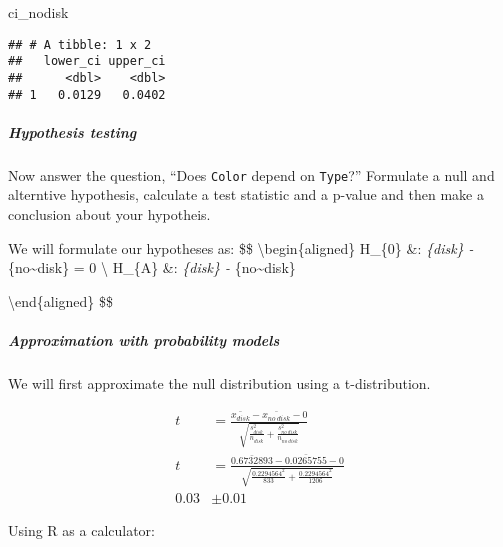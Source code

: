 \documentclass[]{article}
\newenvironment{Shaded}{\begin{snugshade}}{\end{snugshade}}
\newcommand{\NormalTok}[1]{#1}
\let\oldsubparagraph\subparagraph
\renewcommand{\subparagraph}[1]{\oldsubparagraph{#1}\mbox{}}
\begin{document}
\begin{Shaded}
\begin{Highlighting}[]
\NormalTok{ci_nodisk}
\end{Highlighting}
\end{Shaded}

\begin{verbatim}
## # A tibble: 1 x 2
##   lower_ci upper_ci
##      <dbl>    <dbl>
## 1   0.0129   0.0402
\end{verbatim}

\hypertarget{hypothesis-testing-2}{%
\subparagraph{Hypothesis testing}\label{hypothesis-testing-2}}

Now answer the question, ``Does \texttt{Color} depend on
\texttt{Type}?'' Formulate a null and alterntive hypothesis, calculate a
test statistic and a p-value and then make a conclusion about your
hypotheis.

We will formulate our hypotheses as: \$\$
\textbackslash{}begin\{aligned\} H\_\{0\} \&: \mu\emph{\{disk\} -
\mu}\{no\textasciitilde{}disk\} = 0 \textbackslash{} H\_\{A\} \&:
\mu\emph{\{disk\} - \mu}\{no\textasciitilde{}disk\} 

\textbackslash{}end\{aligned\} \$\$

\hypertarget{approximation-with-probability-models-2}{%
\subparagraph{Approximation with probability
models}\label{approximation-with-probability-models-2}}

We will first approximate the null distribution using a t-distribution.

\[
\begin{aligned}
t & = \frac{ \bar{x_{disk}}-\bar{x_{no~disk}} - 0 }{\sqrt{ \frac{s_{disk}^{2}}{n_{disk}} +
  \frac{s_{no~disk}^{2}}{n_{no~disk}}  }} \\
t & = \frac{ \bar{0.6732893}-\bar{0.0265755} - 0 }{\sqrt{ \frac{0.2294564^{2}}{833} +
  \frac{0.2294564^{2}}{1206}  }} \\
0.03 & \pm 0.01
\end{aligned}
\]

Using R as a calculator:
\end{document}
